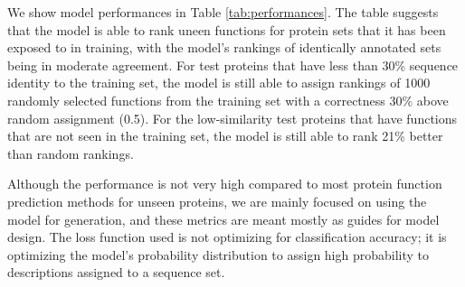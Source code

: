 \documentclass{article}
\begin{document}
        We show model performances in Table \ref{tab:performances}. The table suggests that the model is able to rank uneen functions for protein sets that it has been exposed to in training, with the model's rankings of identically annotated sets being in moderate agreement. For test proteins that have less than 30\% sequence identity to the training set, the model is still able to assign rankings of 1000 randomly selected functions from the training set with a correctness 30\% above random assignment (0.5). For the low-similarity test proteins that have functions that are not seen in the training set, the model is still able to rank 21\% better than random rankings.

        Although the performance is not very high compared to most protein function prediction methods for unseen proteins, we are mainly focused on using the model for generation, and these metrics are meant mostly as guides for model design. The loss function used is not optimizing for classification accuracy; it is optimizing the model's probability distribution to assign high probability to descriptions assigned to a sequence set.
\end{document}
